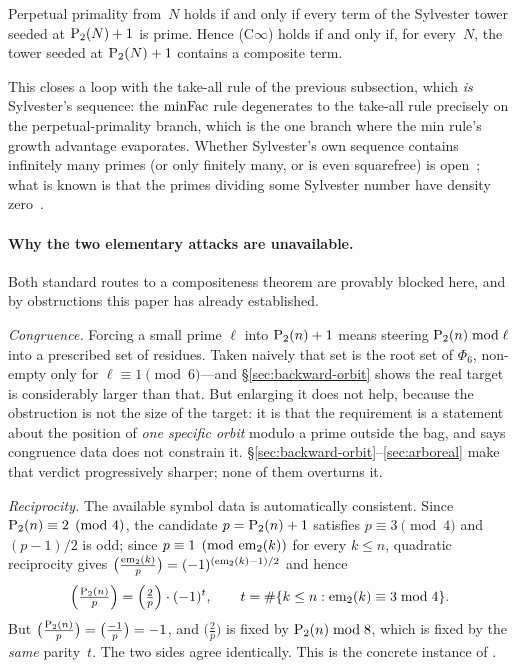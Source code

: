 \begin{theorem}
\label{thm:sylvester-tower}
Perpetual primality from~$N$ holds if and only if every term of the
Sylvester tower seeded at $\mathrm{P}_{2}(N)+1$ is prime.  Hence
(C$\infty$) holds if and only if, for every~$N$, the tower seeded at
$\mathrm{P}_{2}(N)+1$ contains a composite term.
\end{theorem}

\noindent
This closes a loop with the take-all rule of the previous subsection,
which \emph{is} Sylvester's sequence: the $\mathrm{minFac}$ rule degenerates to
the take-all rule precisely on the perpetual-primality branch, which is
the one branch where the min rule's growth advantage evaporates.
Whether Sylvester's own sequence contains infinitely many primes (or
only finitely many, or is even squarefree) is open~\cite{Vardi1991};
what is known is that the primes dividing some Sylvester number have
density zero~\cite{Odoni1985}.

\paragraph{Why the two elementary attacks are unavailable.}
Both standard routes to a compositeness theorem are provably blocked
here, and by obstructions this paper has already established.

\emph{Congruence.}  Forcing a small prime $\ell$ into $\mathrm{P}_{2}(n)+1$
means steering $\mathrm{P}_{2}(n) \bmod \ell$ into a prescribed set of residues.
Taken naively that set is the root set of $\Phi_6$, non-empty only for
$\ell \equiv 1 \pmod 6$---and \S\ref{sec:backward-orbit} shows the real
target is considerably larger than that.  But enlarging it does not help,
because the obstruction is not the size of the target: it is that the
requirement is a statement about the position of \emph{one specific orbit}
modulo a prime outside the bag, and
 says congruence
data does not constrain it.  \S\ref{sec:backward-orbit}--\ref{sec:arboreal}
make that verdict progressively sharper; none of them overturns it.

\emph{Reciprocity.}  The available symbol data is automatically
consistent.  Since $\mathrm{P}_{2}(n) \equiv 2 \pmod 4$, the candidate
$p = \mathrm{P}_{2}(n)+1$ satisfies $p \equiv 3 \pmod 4$ and $(p-1)/2$ is odd;
since $p \equiv 1 \pmod{\mathrm{em}_{2}(k)}$ for every $k \leq n$, quadratic
reciprocity gives $\bigl(\tfrac{\mathrm{em}_{2}(k)}{p}\bigr) = (-1)^{(\mathrm{em}_{2}(k)-1)/2}$
and hence
\[
  \Bigl(\tfrac{\mathrm{P}_{2}(n)}{p}\Bigr) = \Bigl(\tfrac{2}{p}\Bigr) \cdot (-1)^{t},
  \qquad t = \#\{k \leq n : \mathrm{em}_{2}(k) \equiv 3 \bmod 4\}.
\]
But $\bigl(\tfrac{\mathrm{P}_{2}(n)}{p}\bigr) = \bigl(\tfrac{-1}{p}\bigr) = -1$,
and $\bigl(\tfrac{2}{p}\bigr)$ is fixed by $\mathrm{P}_{2}(n) \bmod 8$, which is
fixed by the \emph{same} parity~$t$.  The two sides agree identically.
This is the concrete instance of
.

